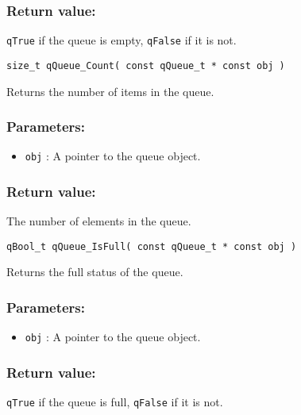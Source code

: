 \subsubsection*{Return value:}
\lstinline{qTrue} if the queue is empty, \lstinline{qFalse} if it is not.

\noindent\hrulefill


\begin{lstlisting}[style=CStyle]
size_t qQueue_Count( const qQueue_t * const obj )
\end{lstlisting}

Returns the number of items in the queue. 

\subsubsection*{Parameters:}
\begin{itemize}
    \item \lstinline{obj} : A pointer to the queue object.
\end{itemize}

\subsubsection*{Return value:}
The number of elements in the queue.

\noindent\hrulefill


\begin{lstlisting}[style=CStyle]
qBool_t qQueue_IsFull( const qQueue_t * const obj )
\end{lstlisting}

Returns the full status of the queue. 

\subsubsection*{Parameters:}
\begin{itemize}
    \item \lstinline{obj} : A pointer to the queue object.
\end{itemize}

\subsubsection*{Return value:}
\lstinline{qTrue} if the queue is full, \lstinline{qFalse} if it is not.

\noindent\hrulefill


